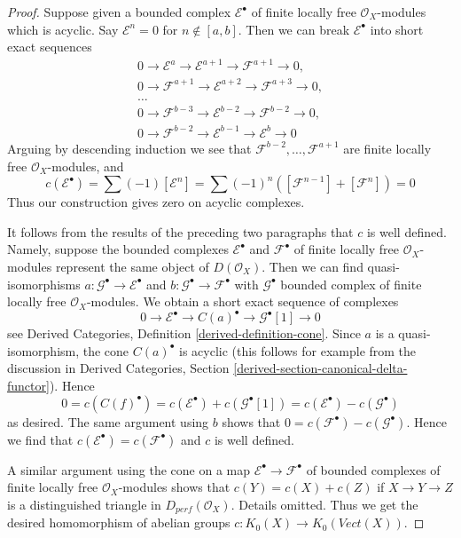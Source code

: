 \begin{proof}
\medskip\noindent
Suppose given a bounded complex $\mathcal{E}^\bullet$
of finite locally free $\mathcal{O}_X$-modules which is acyclic.
Say $\mathcal{E}^n = 0$ for $n \not \in [a, b]$. Then we
can break $\mathcal{E}^\bullet$ into short exact sequences
$$
\begin{matrix}
0 \to \mathcal{E}^a \to \mathcal{E}^{a + 1} \to \mathcal{F}^{a + 1} \to 0,\\
0 \to \mathcal{F}^{a + 1} \to \mathcal{E}^{a + 2} \to
\mathcal{F}^{a + 3} \to 0, \\
\ldots \\
0 \to \mathcal{F}^{b - 3} \to \mathcal{E}^{b - 2} \to
\mathcal{F}^{b - 2} \to 0, \\
0 \to \mathcal{F}^{b - 2} \to \mathcal{E}^{b - 1} \to \mathcal{E}^b \to 0
\end{matrix}
$$
Arguing by descending induction we see that
$\mathcal{F}^{b - 2}, \ldots, \mathcal{F}^{a + 1}$
are finite locally free $\mathcal{O}_X$-modules, and
$$
c(\mathcal{E}^\bullet) = \sum (-1)[\mathcal{E}^n] =
\sum (-1)^n([\mathcal{F}^{n - 1}] + [\mathcal{F}^n]) = 0
$$
Thus our construction gives zero on acyclic complexes.

\medskip\noindent
It follows from the results of the preceding two paragraphs that $c$
is well defined. Namely, suppose the bounded complexes
$\mathcal{E}^\bullet$ and $\mathcal{F}^\bullet$ of finite locally free
$\mathcal{O}_X$-modules represent the same object of $D(\mathcal{O}_X)$.
Then we can find quasi-isomorphisms
$a : \mathcal{G}^\bullet \to \mathcal{E}^\bullet$ and
$b : \mathcal{G}^\bullet \to \mathcal{F}^\bullet$
with $\mathcal{G}^\bullet$ bounded complex of finite locally free
$\mathcal{O}_X$-modules.
We obtain a short exact sequence of complexes
$$
0 \to \mathcal{E}^\bullet \to C(a)^\bullet \to \mathcal{G}^\bullet[1] \to 0
$$
see Derived Categories, Definition \ref{derived-definition-cone}.
Since $a$ is a quasi-isomorphism, the cone $C(a)^\bullet$ is
acyclic (this follows for example from the discussion in
Derived Categories, Section \ref{derived-section-canonical-delta-functor}).
Hence
$$
0 = c(C(f)^\bullet) = c(\mathcal{E}^\bullet) + c(\mathcal{G}^\bullet[1]) =
c(\mathcal{E}^\bullet) - c(\mathcal{G}^\bullet)
$$
as desired. The same argument using $b$ shows that
$0 = c(\mathcal{F}^\bullet) - c(\mathcal{G}^\bullet)$.
Hence we find that $c(\mathcal{E}^\bullet) = c(\mathcal{F}^\bullet)$
and $c$ is well defined.

\medskip\noindent
A similar argument using the cone on a map
$\mathcal{E}^\bullet \to \mathcal{F}^\bullet$
of bounded complexes of finite locally free $\mathcal{O}_X$-modules
shows that $c(Y) = c(X) + c(Z)$ if $X \to Y \to Z$ is a distinguished triangle
in $D_{perf}(\mathcal{O}_X)$. Details omitted.
Thus we get the desired homomorphism
of abelian groups $c : K_0(X) \to K_0(\textit{Vect}(X))$.


\end{proof}

